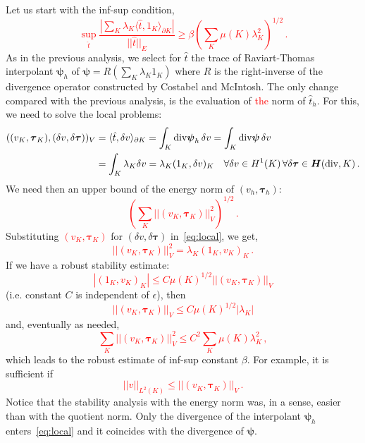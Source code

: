 \documentclass[letterpaper]{article}
\def\bftau{\boldsymbol\tau}
\newcommand{\LRp}[1]{\left( #1 \right)}
\newcommand{\ptl}{{\partial}}
\newcommand{\bfpsi}{\boldsymbol\psi}
\newcommand{\bfH}{\mbox{\boldmath $H$}}
\newcommand{\red}[1]{\textcolor{red}{#1}}
\begin{document}
Let us start with the inf-sup condition,
\red{
\begin{equation}
\sup_{\hat{t}} \frac{| \sum_K \lambda_K \langle \hat{t},1_K \rangle_{\partial K} |}{|| \hat{t} ||_E}
\geq  \beta \LRp{\sum_K \mu(K) \lambda_K^2}^{1/2}\,.
\end{equation}
}
As in the previous analysis, we select for $\hat{t}$ the trace of Raviart-Thomas
interpolant $\bfpsi_h$ of $\bfpsi = R (\sum_K \lambda_K 1_K)$ where $R$ is the right-inverse
of the divergence operator constructed by Costabel and McIntosh. The only change compared
with the previous analysis, is the evaluation of \red{the} norm of $\hat{t}_h$. For this, we need
to solve the local problems:
\red{
\begin{align}
((v_K,\bftau_K), (\delta v, \delta \bftau))_V &= \langle \hat{t}, \delta v \rangle_{\ptl K}
= \int_K \text{div} \bfpsi_h \, \delta v = \int_K \text{div} \bfpsi \, \delta v
\nonumber\\
&= \int_K \lambda_K \delta v
= \lambda_K (1_K,\delta v)_K  \quad \forall \delta v \in
H^1(K)\,\forall\delta\bftau\in\bfH(\text{div},K)\,.
\label{eq:local}
\end{align}
}
We need then an upper bound of the energy norm of $(v_h,\bftau_h)$:
\red{
$$
\LRp{\sum_K || (v_K,\bftau_K) ||_V^2}^{1/2}\,.
$$
}
Substituting \red{$(v_K,\bftau_K)$} for $(\delta v,\delta\bftau)$ in~\eqref{eq:local}, we get,
\red{
\begin{equation}
|| (v_K,\bftau_K) ||_V^2 = \lambda_K (1_K, v_K)_K\,.
\end{equation}
}
If we have a robust stability estimate:
\red{
\begin{equation}
|(1_K, v_K)_K| \leq C \mu(K)^{1/2} || (v_K,\bftau_K) ||_V
\label{eq:robustEst1}
\end{equation}
}
(i.e. constant $C$ is independent of $\epsilon$), then
\red{
\begin{equation}
||  (v_K,\bftau_K) ||_V \leq C \mu(K)^{1/2} | \lambda_K |
\end{equation}
}
and, eventually as needed,
\red{
\begin{equation}
\sum_K || (v_K,\bftau_K) ||_V^2  \leq C^2 \sum_K \mu(K) \lambda_K^2\,,
\end{equation}
}
which leads to the robust estimate of inf-sup constant $\beta$. For example, it is sufficient if
\red{
\begin{equation}
|| v ||_{L^2(K)} \leq || (v_K,\bftau_K) ||_V \, .
\label{eq:robust_est1}
\end{equation}
}
Notice that the stability analysis with the energy norm was, in a sense, easier than
with the quotient norm. Only the divergence of the interpolant $\bfpsi_h$
enters~\eqref{eq:local}
and it coincides with the divergence of $\bfpsi$.
\end{document}
